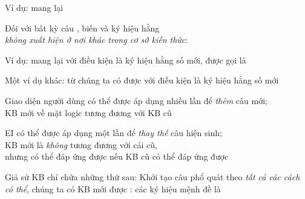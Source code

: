 \documentclass{article}
\begin{document}
\begin{huge}
Ví dụ:  mang lại




Đối với bất kỳ câu \mat{$\alpha$}, biến  và ký hiệu hằng  \\
\emph{không xuất hiện ở nơi khác trong cơ sở kiến thức}:

Ví dụ:  mang lại
với điều kiện  là ký hiệu hằng số mới, được gọi là 

Một ví dụ khác: từ  chúng ta có được
\mat{\[
{{d(e^y)}/{dy}} \eq  e^y
\]}
với điều kiện  là ký hiệu hằng số mới


Giao diện người dùng có thể được áp dụng nhiều lần để \emph{thêm} câu mới;\\
KB mới về mặt logic tương đương với KB cũ

EI có thể được áp dụng một lần để \emph{thay thế} câu hiện sinh;\\
KB mới là \emph{không } tương đương với cái cũ,\\
nhưng có thể đáp ứng được nếu KB cũ có thể đáp ứng được


Giả sử KB chỉ chứa những thứ sau:
Khởi tạo câu phổ quát theo \emph{tất cả các cách có thể}, chúng ta có
KB mới được : các ký hiệu mệnh đề là


\end{huge}
\end{document}
